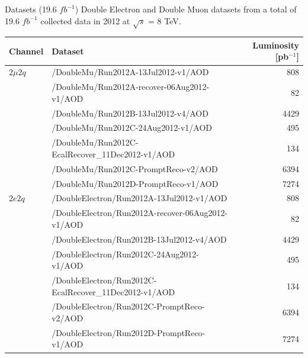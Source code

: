\begin{frame}{Datasets (19.6 $fb^{-1}$)}
Double Electron and Double Muon datasets from a total of 19.6 $fb^{-1}$ collected data in 2012 at $\sqrt{s}$ = 8 TeV.\\
\vspace{1em}
\scriptsize
\begin{tabular}{|l|l|r|}
\hline
Channel & Dataset & Luminosity [pb$^{-1}$] \\
\hline
$2\mu2q$ & /DoubleMu/Run2012A-13Jul2012-v1/AOD & 808\\
         & /DoubleMu/Run2012A-recover-06Aug2012-v1/AOD & 82\\
         & /DoubleMu/Run2012B-13Jul2012-v4/AOD & 4429 \\
         & /DoubleMu/Run2012C-24Aug2012-v1/AOD & 495 \\
         & /DoubleMu/Run2012C-EcalRecover\_11Dec2012-v1/AOD & 134\\
         & /DoubleMu/Run2012C-PromptReco-v2/AOD & 6394\\
         & /DoubleMu/Run2012D-PromptReco-v1/AOD & 7274\\
\hline 
$2e2q$   & /DoubleElectron/Run2012A-13Jul2012-v1/AOD & 808\\
         & /DoubleElectron/Run2012A-recover-06Aug2012-v1/AOD & 82\\
         & /DoubleElectron/Run2012B-13Jul2012-v4/AOD & 4429\\
         & /DoubleElectron/Run2012C-24Aug2012-v1/AOD & 495\\
         & /DoubleElectron/Run2012C-EcalRecover\_11Dec2012-v1/AOD & 134\\
         & /DoubleElectron/Run2012C-PromptReco-v2/AOD & 6394\\
         & /DoubleElectron/Run2012D-PromptReco-v1/AOD & 7274\\
\hline
\end{tabular}

\end{frame}




